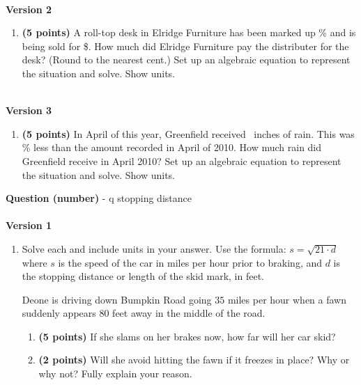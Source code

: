 \documentclass[12pt]{amsart}
\begin{document}
\begin{enumerate}[resume]
\vfill 
 \end{enumerate}$ $ \\ {\bf Version 2} \\\begin{enumerate}[resume]
\item {\bf (5 points)} 
 A roll-top desk in Elridge Furniture has been marked up \discount\% and is being sold for \$\paid. How much did Elridge Furniture pay the distributer for the desk? (Round to the nearest cent.) Set up an algebraic equation to represent the situation and solve. Show units.

\vfill 
 \end{enumerate}$ $ \\ {\bf Version 3} \\\begin{enumerate}[resume]
\item {\bf (5 points)} 
 In April of this year, Greenfield received \rainy\ inches of rain. This was \discount\% less than the amount recorded in April of 2010. How much rain did Greenfield  receive in April 2010? Set up an algebraic equation to represent the situation and solve. Show units.

\vfill 
 \end{enumerate}\newpage\def \insvar{21}\def \d{80}\def \zerospeed{40.99}\def \slimit{35}\def \s{52}\def \skidd{128.762}\def \safed{58.333}\def \rsafed{58}{\Large{\bf Question (number)}} - q stopping distance\\ $ $ \\ {\bf Version 1} \\\begin{enumerate}[resume]

 
\item Solve each and include units in your answer. Use the formula: $s = \sqrt{\insvar \cdot d}$ where $s$ is the speed of the car in miles per hour prior to braking, and $d$ is the stopping distance or length of the skid mark, in feet. 

\vspace{3mm}

Deone is driving down Bumpkin Road going $\slimit$ miles per hour when a fawn suddenly appears $\d$ feet away in the middle of the road. \begin{enumerate}
\item {\bf (5 points)} If she slams on her brakes now, how far will her car skid? \vspace{4cm}
\item {\bf (2 points)} Will she avoid hitting the fawn if it freezes in place? Why or why not? Fully explain your reason. \vspace{3cm}
\end{enumerate}



\end{enumerate}
\end{document}
